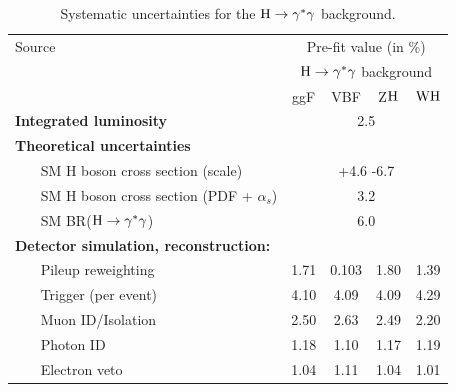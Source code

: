 		
		\begin{table}[!ht]
		\small
		  \begin{center}
		    
		    \begin{tabular}{lcccc}
		      \hline
		      Source & \multicolumn{4}{c}{Pre-fit value (in \%)} \\
	      \cline{2-5}
	      & \multicolumn{4}{c}{$\mathrm{H}\to\gamma^{*}\gamma$ background} \\ 
	      & ggF &  VBF & Z$\mathrm{H}$ & $\text{W}\mathrm{H}$ \\
	      \hline
	      \textbf{Integrated luminosity} & \multicolumn{4}{c}{2.5}\\
	      \textbf{Theoretical uncertainties} & \multicolumn{4}{c}{ } \\
	      ~~~ SM H boson cross section (scale) & \multicolumn{4}{c}{+4.6 -6.7} \\
	      ~~~ SM H boson cross section (PDF + $\alpha_{s}$) & \multicolumn{4}{c}{3.2} \\
	      ~~~ SM BR($\mathrm{H}\to\gamma^{*}\gamma$) & \multicolumn{4}{c}{6.0} \\
	      \textbf{Detector simulation, reconstruction:} & \multicolumn{4}{c}{ }\\
	      ~~~ Pileup reweighting  &  1.71 & 0.103 & 1.80 & 1.39       \\
	      ~~~ Trigger (per event) &   4.10 & 4.09 & 4.09 & 4.29 \\ 
	      ~~~ Muon ID/Isolation & 2.50 & 2.63 & 2.49 & 2.20 \\
	      ~~~ Photon ID &  1.18 & 1.10 & 1.17 & 1.19  \\
	      ~~~ Electron veto &  1.04 & 1.11 & 1.04 & 1.01 \\
	      \hline
	    \end{tabular}
	    \caption{Systematic uncertainties for the $\mathrm{H}\to\gamma^{*}\gamma$ background.\label{tab:systHDalitz}}
	  \end{center}
	\end{table}
	

